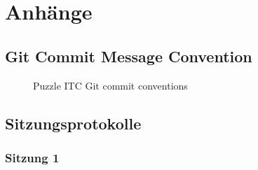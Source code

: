 \chapter{Anhänge}

\section{Git Commit Message Convention}
\label{sec:gitconv}
\begin{figure}[h]
    \centering
    \caption{Puzzle ITC Git commit conventions}
\end{figure}

\section{Sitzungsprotokolle}
\subsection{Sitzung 1}

